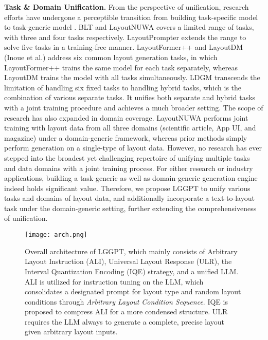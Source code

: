 \textbf{Task \& Domain Unification.} From the perspective of unification, research efforts have undergone a perceptible transition from building task-specific model \cite{lee2020neural,layouttf2021gupta,vtn2021arroyo,layoutganpp2021kikuchi,ctf2022jiang} to task-generic model \cite{blt2022kong,layoutdm2023Inoue,LDGM2023hui,layouttfpp2023jiang,layoutprompter2023lin,layoutnuwa2024tang}. BLT \cite{blt2022kong} and LayoutNUWA \cite{layoutnuwa2024tang} covers a limited range of tasks, with three and four tasks respectively. LayoutPrompter \cite{layoutprompter2023lin} extends the range to solve five tasks in a training-free manner. LayoutFormer++ \cite{layouttfpp2023jiang} and LayoutDM (Inoue et al.) \cite{layoutdm2023Inoue} address six common layout generation tasks, in which LayoutFormer++ trains the same model for each task separately, whereas LayoutDM trains the model with all tasks simultaneously. LDGM \cite{LDGM2023hui} transcends the limitation of handling six fixed tasks to handling hybrid tasks, which is the combination of various separate tasks. It unifies both separate and hybrid tasks with a joint training procedure and achieves a much broader setting. The scope of research has also expanded in domain coverage. LayoutNUWA \cite{layoutnuwa2024tang} performs joint training with layout data from all three domains (scientific article, App UI, and magazine) under a domain-generic framework, whereas prior methods simply perform generation on a single-type of layout data. However, no research has ever stepped into the broadest yet challenging repertoire of unifying multiple tasks and data domains with a joint training process. For either research or industry applications, building a task-generic as well as domain-generic generation engine indeed holds significant value. Therefore, we propose LGGPT to unify various tasks and domains of layout data, and additionally incorporate a text-to-layout task \cite{lin2023iccv} under the domain-generic setting, further extending the comprehensiveness of unification.

\begin{figure*}[t]
	\centering
	\texttt{[image: arch.png]}{}
	\caption{Overall architecture of LGGPT, which mainly consists of Arbitrary Layout Instruction (ALI), Universal Layout Response (ULR), the Interval Quantization Encoding (IQE) strategy, and a unified LLM. ALI is utilized for instruction tuning on the LLM, which consolidates a designated prompt for layout type and random layout conditions through \emph{Arbitrary Layout Condition Sequence}. IQE is proposed to compress ALI for a more condensed structure. ULR requires the LLM always to generate a complete, precise layout given arbitrary layout inputs.}
	\label{Fig::arch}
\end{figure*}

